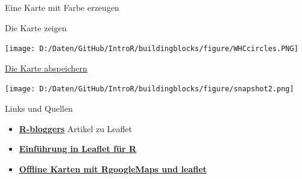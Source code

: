\documentclass[ignorenonframetext,]{beamer}
\newenvironment{Shaded}{\begin{snugshade}}{\end{snugshade}}
\newcommand{\KeywordTok}[1]{\textcolor[rgb]{0.26,0.66,0.93}{\textbf{#1}}}
\newcommand{\DataTypeTok}[1]{\textcolor[rgb]{0.74,0.68,0.62}{\underline{#1}}}
\newcommand{\StringTok}[1]{\textcolor[rgb]{0.02,0.61,0.04}{#1}}
\newcommand{\OperatorTok}[1]{\textcolor[rgb]{0.74,0.68,0.62}{#1}}
\newcommand{\NormalTok}[1]{\textcolor[rgb]{0.74,0.68,0.62}{#1}}
\begin{document}
\begin{frame}[fragile]{Eine Karte mit Farbe erzeugen}

\begin{Shaded}
\end{Shaded}

\end{frame}

\begin{frame}{Die Karte zeigen}

\texttt{[image: D:/Daten/GitHub/IntroR/buildingblocks/figure/WHCcircles.PNG]}

\end{frame}

\begin{frame}{\href{http://www.r-bloggers.com/interactive-mapping-with-leaflet-in-r-2/}{Die
Karte abspeichern}}

\texttt{[image: D:/Daten/GitHub/IntroR/buildingblocks/figure/snapshot2.png]}

\end{frame}

\begin{frame}{Links und Quellen}

\begin{itemize}
\item
  \href{http://www.r-bloggers.com/the-leaflet-package-for-online-mapping-in-r/}{\textbf{R-bloggers}}
  Artikel zu Leaflet
\item
  \href{https://rstudio.github.io/leaflet/}{\textbf{Einführung in
  Leaflet für R}}
\item
  \href{https://blog.hwr-berlin.de/codeandstats/category/scientific-software/r/}{\textbf{Offline
  Karten mit RgoogleMaps und leaflet}}
\end{itemize}

\end{frame}
\end{document}
